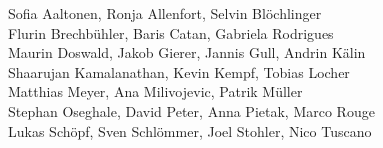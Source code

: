 %
%
%
Sofia Aaltonen,		%
Ronja Allenfort,	%
Selvin Blöchlinger%
\\
Flurin Brechbühler,	%
Baris Catan,		%
Gabriela Rodrigues%
\\
Maurin Doswald,		%
Jakob Gierer,		%
Jannis Gull,		%
Andrin Kälin%
\\
Shaarujan Kamalanathan,	%
Kevin Kempf,		%
Tobias Locher%
\\
Matthias Meyer,		%
Ana Milivojevic,	%
Patrik Müller%
\\
Stephan Oseghale,	%
David Peter,		%
Anna Pietak,		%
Marco Rouge%
\\
Lukas Schöpf,		%
Sven Schlömmer,		%
Joel Stohler,		%
Nico Tuscano%
